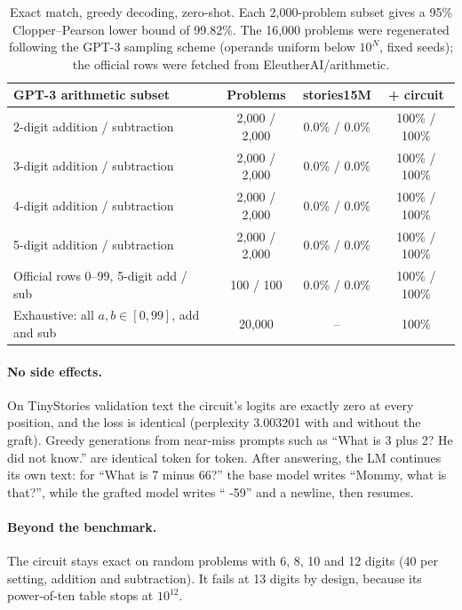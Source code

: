 \documentclass[11pt]{article}
\begin{document}
\begin{table}[h]
\centering
\small
\begin{tabular}{lccc}
\toprule
GPT-3 arithmetic subset & Problems & stories15M & + circuit \\
\midrule
2-digit addition / subtraction & 2{,}000 / 2{,}000 & 0.0\% / 0.0\% & 100\% / 100\% \\
3-digit addition / subtraction & 2{,}000 / 2{,}000 & 0.0\% / 0.0\% & 100\% / 100\% \\
4-digit addition / subtraction & 2{,}000 / 2{,}000 & 0.0\% / 0.0\% & 100\% / 100\% \\
5-digit addition / subtraction & 2{,}000 / 2{,}000 & 0.0\% / 0.0\% & 100\% / 100\% \\
Official rows 0--99, 5-digit add / sub & 100 / 100 & 0.0\% / 0.0\% & 100\% / 100\% \\
Exhaustive: all $a,b\in[0,99]$, add and sub & 20{,}000 & -- & 100\% \\
\bottomrule
\end{tabular}
\caption{Exact match, greedy decoding, zero-shot. Each 2{,}000-problem subset gives a 95\% Clopper--Pearson lower bound of 99.82\%. The 16{,}000 problems were regenerated following the GPT-3 sampling scheme (operands uniform below $10^N$, fixed seeds); the official rows were fetched from EleutherAI/arithmetic.}
\end{table}

\paragraph{No side effects.} On TinyStories validation text the circuit's logits are exactly zero at every position, and the loss is identical (perplexity 3.003201 with and without the graft). Greedy generations from near-miss prompts such as ``What is 3 plus 2? He did not know.'' are identical token for token. After answering, the LM continues its own text: for ``What is 7 minus 66?'' the base model writes ``Mommy, what is that?'', while the grafted model writes `` -59'' and a newline, then resumes.

\paragraph{Beyond the benchmark.} The circuit stays exact on random problems with 6, 8, 10 and 12 digits (40 per setting, addition and subtraction). It fails at 13 digits by design, because its power-of-ten table stops at $10^{12}$.
\end{document}
